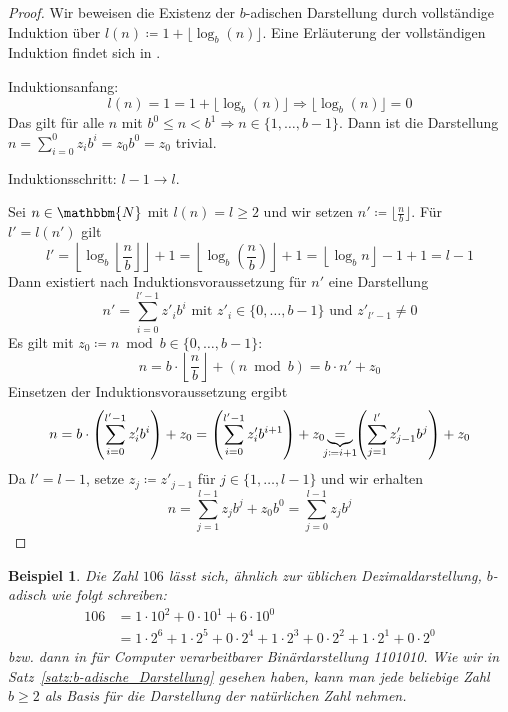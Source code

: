 \documentclass{article}
\newcommand{\N}{\mathbbm{N}} %
\newtheorem{beispiel}[satz]{Beispiel}
\begin{document}
\begin{proof}
      Wir beweisen die Existenz der $b$-adischen Darstellung durch vollständige Induktion über $l(n) \coloneq 1+ \lfloor \log_b(n) \rfloor$. 
      Eine Erläuterung der vollständigen Induktion findet sich in \cite[S.~26]{hougardy2018}.

      Induktionsanfang: 
      \begin{equation*}
        l(n) = 1 = 1+ \lfloor \log_b(n) \rfloor \Rightarrow \lfloor \log_b(n) \rfloor = 0
      \end{equation*}
      Das gilt für alle $n$ mit $b^0 \leq n < b^1 \Rightarrow n \in \{1, \dots, b-1\}$. 
      Dann ist die Darstellung $n = \sum_{i=0}^0 z_i b^i = z_0 b^0 = z_0$ trivial.

      Induktionsschritt: $l-1 \to l$. 

      Sei $n\in\N$ mit $l(n) = l \geq 2$ und wir setzen $n' \coloneq \lfloor \frac{n}{b} \rfloor$.
      Für $l' = l(n')$ gilt \[l' = \left\lfloor \log_b \left\lfloor \frac{n}{b} \right\rfloor \right\rfloor + 1 = \left\lfloor \log_b (\frac{n}{b}) \right\rfloor + 1 = \left\lfloor \log_b n \right\rfloor - 1 + 1 = l - 1\]
      Dann existiert nach Induktionsvoraussetzung für $n'$ eine Darstellung 
      \[n' = \sum_{i=0}^{l' -1} z'_i b^i \text{ mit } z'_i \in \{0,\dots,b-1\} \text{ und } z'_{l'-1} \neq 0\]
      Es gilt mit $z_0 \coloneq n \bmod b \in \{0, \dots, b-1 \}$:
      \[n = b \cdot \left\lfloor \frac{n}{b} \right\rfloor + (n \bmod b) = b \cdot n' + z_0\]
      Einsetzen der Induktionsvoraussetzung ergibt
      \begin{align*}
        n = b\cdot \left(\sum_{i=0}^{l'-1}z'_i b^i\right) + z_0 = \left(\sum_{i=0}^{l'-1}z'_i b^{i+1}\right) + z_0
        \underbrace{=}_{\mathclap{j\coloneq i+1}} \left(\sum_{j=1}^{l'} z'_{j-1}b^j\right) + z_0
      \end{align*}
      Da $l' = l-1$, setze $z_j \coloneq z'_{j-1}$ für $j \in \{1,\dots,l-1\}$ und wir erhalten
      \begin{equation*}
        n = \sum_{j=1}^{l-1} z_j b^j + z_0 b^0 = \sum_{j=0}^{l-1} z_jb^j
      \end{equation*}

    \end{proof}

  \begin{beispiel} \label{bsp:Binärdarstellung}
    Die Zahl $106$ lässt sich, ähnlich zur üblichen Dezimaldarstellung, $b$-adisch wie folgt schreiben:
    \begin{align*}
      106 &= 1 \cdot 10^2 + 0 \cdot 10^1 + 6 \cdot 10^0 \\
          &= 1 \cdot 2^6 + 1 \cdot 2^5 + 0 \cdot 2^4 + 1 \cdot 2^3 + 0 \cdot 2^2 + 1 \cdot 2^1 + 0 \cdot 2^0
    \end{align*}
    bzw. dann in für Computer verarbeitbarer Binärdarstellung 1101010. 
    Wie wir in Satz~\ref{satz:b-adische_Darstellung} gesehen haben, kann man jede beliebige Zahl $b\geq 2$ als Basis für die Darstellung der natürlichen Zahl nehmen.
  \end{beispiel}
\end{document}
